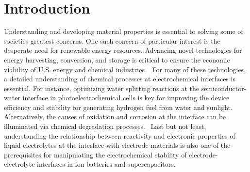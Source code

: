 \chapter{Introduction}

Understanding and developing material properties is essential to solving some of societies greatest concerns. One such concern of particular interest is the desperate need for renewable energy resources.
Advancing novel technologies for energy harvesting, conversion, and storage is critical to ensure the economic viability of U.S. energy and chemical industries.~\cite{eia,renewable} For many of these technologies, a detailed understanding of chemical processes at electrochemical interfaces is essential. For instance, optimizing water splitting reactions at the semiconductor-water interface in photoelectrochemical cells is key for improving the device efficiency and stability for generating hydrogen fuel from water and sunlight.~\cite{mccrory2015} Alternatively, the causes of oxidation and corrosion at the interface can be illuminated via chemical degradation processes.~\cite{huang2019} Last but not least, understanding the relationship between reactivity and electronic properties of liquid electrolytes at the interface with electrode materials is also one of the prerequisites for manipulating the electrochemical stability of electrode-electrolyte interfaces in ion batteries and supercapacitors.~\cite{wang2018}

